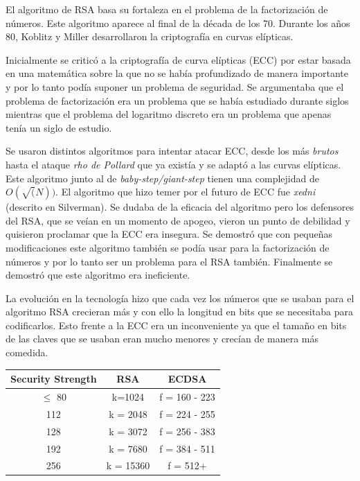 \documentclass{article}
\begin{document}
El algoritmo de RSA basa su fortaleza en el problema de la
factorización de números. Este algoritmo aparece al final de la década
de los 70. Durante los años 80, Koblitz y Miller desarrollaron la
criptografía en curvas elípticas.

Inicialmente se criticó a la criptografía de curva elípticas (ECC) por
estar basada en una matemática sobre la que no se había profundizado
de manera importante y por lo tanto podía suponer un problema de
seguridad. Se argumentaba que el problema de factorización era un
problema que se había estudiado durante siglos mientras que el
problema del logaritmo discreto era un problema que apenas tenía un
siglo de estudio.

Se usaron distintos algoritmos para intentar atacar ECC, desde los más
\textit{brutos} hasta el ataque \emph{rho de Pollard} que ya existía y
se adaptó a las curvas elípticas. Este algoritmo junto al de
\textit{baby-step/giant-step} tienen una complejidad de
$O(\sqrt(N))$. El algoritmo que hizo temer por el futuro de ECC fue
\textit{xedni} (descrito en Silverman). Se dudaba de la eficacia del
algoritmo pero los defensores del RSA, que se veían en un momento de
apogeo, vieron un punto de debilidad y quisieron proclamar que la ECC
era insegura. Se demostró que con pequeñas modificaciones este
algoritmo también se podía usar para la factorización de números y por
lo tanto ser un problema para el RSA también. Finalmente se demostró
que este algoritmo era ineficiente.

La evolución en la tecnología hizo que cada vez los números que se
usaban para el algoritmo RSA crecieran más y con ello la longitud en
bits que se necesitaba para codificarlos. Esto frente a la ECC era un
inconveniente ya que el tamaño en bits de las claves que se usaban
eran mucho menores y crecían de manera más comedida.

\begin{table}[H]
\centering
\begin{tabular}{|c|c|c|}
\hline
\textbf{Security Strength} & \textbf{RSA} & \textbf{ECDSA} \\ \hline
$\leq$ 80                  & k=1024       & f = 160 - 223  \\
112                        & k = 2048     & f = 224 - 255  \\
128                        & k = 3072     & f = 256 - 383  \\
192                        & k = 7680     & f = 384 - 511  \\
256                        & k = 15360    & f = 512+       \\ \hline
\end{tabular}
\end{table}
\end{document}
